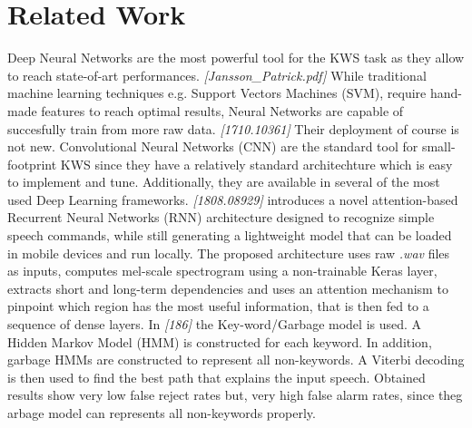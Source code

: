 
\section{Related Work}
\label{sec:related_work}

\noindent 
Deep Neural Networks are the most powerful tool for the KWS task as they allow to reach state-of-art performances. {\it [Jansson_Patrick.pdf]} While traditional machine learning techniques e.g. Support Vectors Machines (SVM), require hand-made features to reach optimal results, Neural Networks are capable of succesfully train from more raw data. {\it [1710.10361]} Their deployment of course is not new. Convolutional Neural Networks (CNN) are the standard tool for small-footprint KWS since they have a relatively standard architechture which is easy to implement and tune. Additionally, they are available in several of the most used Deep Learning frameworks. {\it [1808.08929] } introduces a novel attention-based Recurrent Neural Networks (RNN) architecture designed to recognize simple speech commands, while still generating a lightweight model that can be loaded in mobile devices and run locally. The proposed architecture uses raw {\it .wav} files as inputs, computes mel-scale spectrogram using a non-trainable Keras layer, extracts short and long-term dependencies and uses an attention mechanism to pinpoint which region has the most useful information, that is then fed to a sequence of dense layers. In {\it [186]} the Key-word/Garbage model is used. A Hidden Markov Model (HMM) is constructed for each keyword. In addition, garbage HMMs are constructed to represent all non-keywords. A Viterbi decoding is then used to find the best path that explains the input speech. Obtained results show very low false reject rates but, very high false alarm rates, since theg arbage model can represents all non-keywords properly.

%
